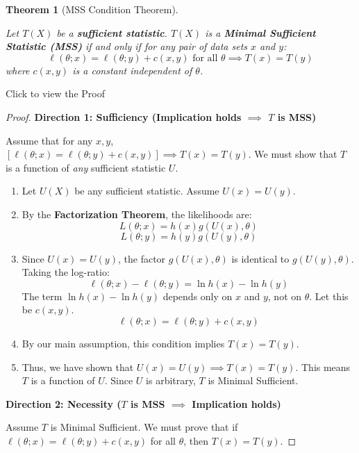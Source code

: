 \documentclass[
  letterpaper,
  DIV=11,
  numbers=noendperiod]{scrreprt}
\renewcommand{\[}{\begin{equation}}
\renewcommand{\]}{\end{equation}}
\theoremstyle{definition}
\theoremstyle{plain}
\theoremstyle{plain}
\theoremstyle{plain}
\newtheorem{theorem}{Theorem}[chapter]
\theoremstyle{definition}
\theoremstyle{plain}
\theoremstyle{remark}
\begin{document}
\begin{theorem}[MSS Condition
Theorem]\protect\hypertarget{thm-mss-loglik}{}\label{thm-mss-loglik}

Let \(T(X)\) be a \textbf{sufficient statistic}. \(T(X)\) is a
\textbf{Minimal Sufficient Statistic (MSS)} if and only if for any pair
of data sets \(x\) and \(y\): \[
\ell(\theta; x) = \ell(\theta; y) + c(x, y) \text{ for all } \theta \implies T(x) = T(y)
\] where \(c(x, y)\) is a constant independent of \(\theta\).

\end{theorem}

Click to view the Proof

\begin{proof}
\textbf{Direction 1: Sufficiency (Implication holds \(\implies\) \(T\)
is MSS)}

Assume that for any \(x, y\),
\([\ell(\theta; x) = \ell(\theta; y) + c(x, y)] \implies T(x) = T(y)\).
We must show that \(T\) is a function of \emph{any} sufficient statistic
\(U\).

\begin{enumerate}
\def\labelenumi{\arabic{enumi}.}
\item
  Let \(U(X)\) be any sufficient statistic. Assume \(U(x) = U(y)\).
\item
  By the \textbf{Factorization Theorem}, the likelihoods are: \[
      L(\theta; x) = h(x)g(U(x), \theta)
      \] \[
      L(\theta; y) = h(y)g(U(y), \theta)
      \]
\item
  Since \(U(x) = U(y)\), the factor \(g(U(x), \theta)\) is identical to
  \(g(U(y), \theta)\). Taking the log-ratio: \[
  \ell(\theta; x) - \ell(\theta; y) = \ln h(x) - \ln h(y)
  \] The term \(\ln h(x) - \ln h(y)\) depends only on \(x\) and \(y\),
  not on \(\theta\). Let this be \(c(x,y)\). \[
  \ell(\theta; x) = \ell(\theta; y) + c(x, y)
  \]
\item
  By our main assumption, this condition implies \(T(x) = T(y)\).
\item
  Thus, we have shown that \(U(x) = U(y) \implies T(x) = T(y)\). This
  means \(T\) is a function of \(U\). Since \(U\) is arbitrary, \(T\) is
  Minimal Sufficient.
\end{enumerate}

\textbf{Direction 2: Necessity (\(T\) is MSS \(\implies\) Implication
holds)}

Assume \(T\) is Minimal Sufficient. We must prove that if
\(\ell(\theta; x) = \ell(\theta; y) + c(x, y)\) for all \(\theta\), then
\(T(x) = T(y)\).


\end{proof}
\end{document}
